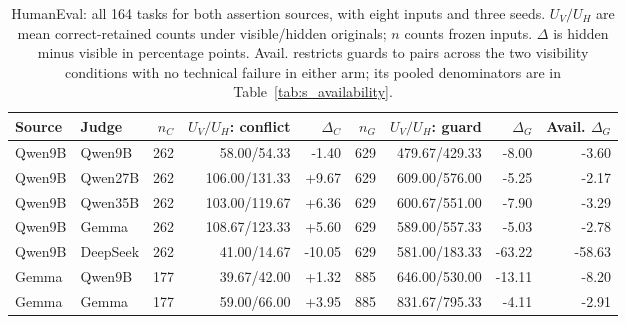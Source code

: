 \begin{table}[t]
\centering
\small
\caption{HumanEval: all 164 tasks for both assertion sources, with eight inputs and three seeds. $U_V/U_H$ are mean correct-retained counts under visible/hidden originals; $n$ counts frozen inputs. $\Delta$ is hidden minus visible in percentage points. Avail. restricts guards to pairs across the two visibility conditions with no technical failure in either arm; its pooled denominators are in Table~\ref{tab:s_availability}.}
\label{tab:visibility}
\begin{tabular}{llrrrrrrr}
\toprule
Source & Judge & $n_C$ & $U_V/U_H$: conflict & $\Delta_C$ & $n_G$ & $U_V/U_H$: guard & $\Delta_G$ & Avail. $\Delta_G$ \\
\midrule
Qwen9B & Qwen9B & 262 & 58.00/54.33 & -1.40 & 629 & 479.67/429.33 & -8.00 & -3.60 \\
Qwen9B & Qwen27B & 262 & 106.00/131.33 & +9.67 & 629 & 609.00/576.00 & -5.25 & -2.17 \\
Qwen9B & Qwen35B & 262 & 103.00/119.67 & +6.36 & 629 & 600.67/551.00 & -7.90 & -3.29 \\
Qwen9B & Gemma & 262 & 108.67/123.33 & +5.60 & 629 & 589.00/557.33 & -5.03 & -2.78 \\
Qwen9B & DeepSeek & 262 & 41.00/14.67 & -10.05 & 629 & 581.00/183.33 & -63.22 & -58.63 \\
Gemma & Qwen9B & 177 & 39.67/42.00 & +1.32 & 885 & 646.00/530.00 & -13.11 & -8.20 \\
Gemma & Gemma & 177 & 59.00/66.00 & +3.95 & 885 & 831.67/795.33 & -4.11 & -2.91 \\
\bottomrule
\end{tabular}
\end{table}
